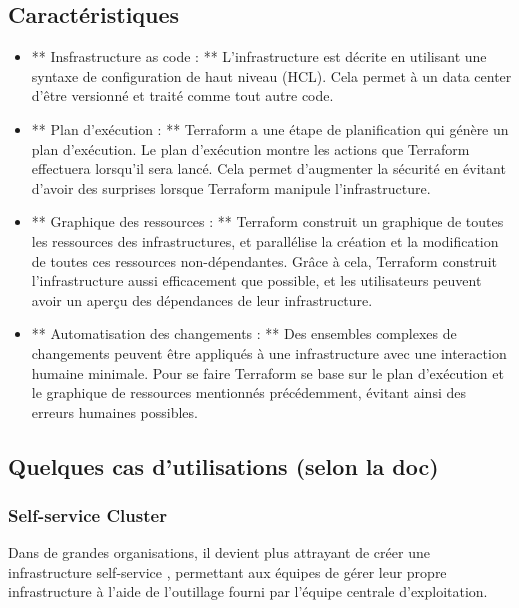 \documentclass[]{article}
\begin{document}
\subsection{Caractéristiques}\label{caractuxe9ristiques}

\begin{itemize}
\item
  ** Insfrastructure as code : ** L'infrastructure est décrite en
  utilisant une syntaxe de configuration de haut niveau (HCL). Cela
  permet à un data center d'être versionné et traité comme tout autre
  code.
\item
  ** Plan d'exécution : ** Terraform a une étape de \og planification
  \fg qui génère un plan d'exécution. Le plan d'exécution montre les
  actions que Terraform effectuera lorsqu'il sera lancé. Cela permet
  d'augmenter la sécurité en évitant d'avoir des surprises lorsque
  Terraform manipule l'infrastructure.
\item
  ** Graphique des ressources : ** Terraform construit un graphique de
  toutes les ressources des infrastructures, et parallélise la création
  et la modification de toutes ces ressources non-dépendantes. Grâce à
  cela, Terraform construit l'infrastructure aussi efficacement que
  possible, et les utilisateurs peuvent avoir un aperçu des dépendances
  de leur infrastructure.
\item
  ** Automatisation des changements : ** Des ensembles complexes de
  changements peuvent être appliqués à une infrastructure avec une
  interaction humaine minimale. Pour se faire Terraform se base sur le
  plan d'exécution et le graphique de ressources mentionnés
  précédemment, évitant ainsi des erreurs humaines possibles.
\end{itemize}

\subsection{Quelques cas d'utilisations (selon la
doc)}\label{quelques-cas-dutilisations-selon-la-doc}

\subsubsection{Self-service Cluster}\label{self-service-cluster}

Dans de grandes organisations, il devient plus attrayant de créer une
infrastructure \og self-service \fg, permettant aux équipes de gérer
leur propre infrastructure à l'aide de l'outillage fourni par l'équipe
centrale d'exploitation.
\end{document}
